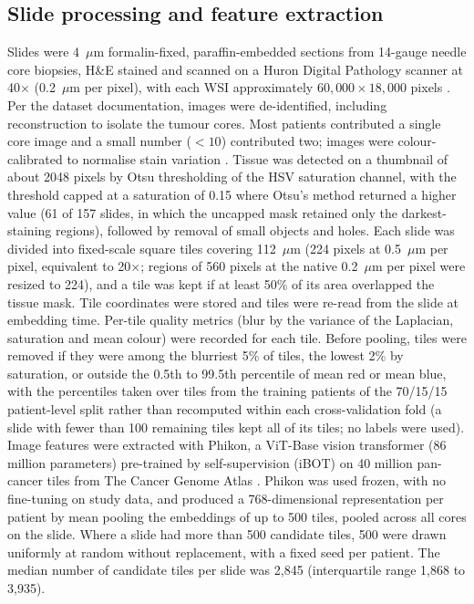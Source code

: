 \documentclass[10pt,a4paper,twocolumn]{article}
\begin{document}
\subsection{Slide processing and feature extraction}
Slides were 4~$\mu$m formalin-fixed, paraffin-embedded sections from 14-gauge needle core biopsies, H\&E stained and scanned on a Huron Digital Pathology scanner at 40$\times$ (0.2~$\mu$m per pixel), with each WSI approximately $60{,}000 \times 18{,}000$ pixels \cite{tran2025}. Per the dataset documentation, images were de-identified, including reconstruction to isolate the tumour cores. Most patients contributed a single core image and a small number ($<10$) contributed two; images were colour-calibrated to normalise stain variation \cite{tran2026keynote}. Tissue was detected on a thumbnail of about 2048 pixels by Otsu thresholding of the HSV saturation channel, with the threshold capped at a saturation of 0.15 where Otsu's method returned a higher value (61 of 157 slides, in which the uncapped mask retained only the darkest-staining regions), followed by removal of small objects and holes. Each slide was divided into fixed-scale square tiles covering 112~$\mu$m (224 pixels at 0.5~$\mu$m per pixel, equivalent to 20$\times$; regions of 560 pixels at the native 0.2~$\mu$m per pixel were resized to 224), and a tile was kept if at least 50\% of its area overlapped the tissue mask. Tile coordinates were stored and tiles were re-read from the slide at embedding time. Per-tile quality metrics (blur by the variance of the Laplacian, saturation and mean colour) were recorded for each tile. Before pooling, tiles were removed if they were among the blurriest 5\% of tiles, the lowest 2\% by saturation, or outside the 0.5th to 99.5th percentile of mean red or mean blue, with the percentiles taken over tiles from the training patients of the 70/15/15 patient-level split rather than recomputed within each cross-validation fold (a slide with fewer than 100 remaining tiles kept all of its tiles; no labels were used). Image features were extracted with Phikon, a ViT-Base vision transformer (86 million parameters) pre-trained by self-supervision (iBOT) on 40 million pan-cancer tiles from The Cancer Genome Atlas \cite{filiot2023}. Phikon was used frozen, with no fine-tuning on study data, and produced a 768-dimensional representation per patient by mean pooling the embeddings of up to 500 tiles, pooled across all cores on the slide. Where a slide had more than 500 candidate tiles, 500 were drawn uniformly at random without replacement, with a fixed seed per patient. The median number of candidate tiles per slide was 2,845 (interquartile range 1,868 to 3,935).
\end{document}
